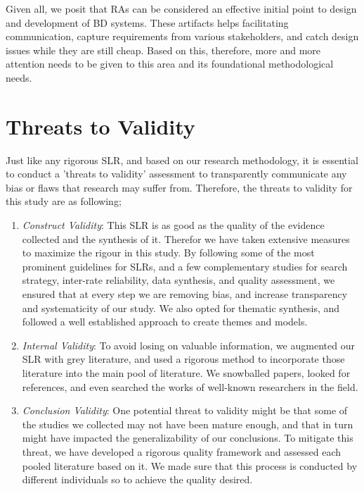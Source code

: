 \documentclass{ieeeaccess}
\begin{document}
Given all, we posit that RAs can be considered an effective initial point to design and development of BD systems. These artifacts helps facilitating communication, capture requirements from various stakeholders, and catch design issues while they are still cheap. Based on this, therefore, more and more attention needs to be given to this area and its foundational methodological needs. 

\section{Threats to Validity}

Just like any rigorous SLR, and based on our research methodology, it is essential to conduct a 'threats to validity' assessment to transparently communicate any bias or flaws that research may suffer from. Therefore, the threats to validity for this study are as following;

\begin{enumerate}
    \item \emph{Construct Validity}: This SLR is as good as the quality of the evidence collected and the synthesis of it. Therefor we have taken extensive measures to maximize the rigour in this study. By following some of the most prominent guidelines for SLRs, and a few complementary studies for search strategy, inter-rate reliability, data synthesis, and quality assessment, we ensured that at every step we are removing bias, and increase transparency and systematicity of our study. We also opted for thematic synthesis, and followed a well established approach to create themes and models.
    \item \emph{Internal Validity}: To avoid losing on valuable information, we augmented our SLR with grey literature, and used a rigorous method to incorporate those literature into the main pool of literature. We snowballed papers, looked for references, and even searched the works of well-known researchers in the field. 
    \item \emph{Conclusion Validity}: One potential threat to validity might be that some of the studies we collected may not have been mature enough, and that in turn might have impacted the generalizability of our conclusions. To mitigate this threat, we have developed a rigorous quality framework and assessed each pooled literature based on it. We made sure that this process is conducted by different individuals so to achieve the quality desired. 
\end{enumerate}
\end{document}
